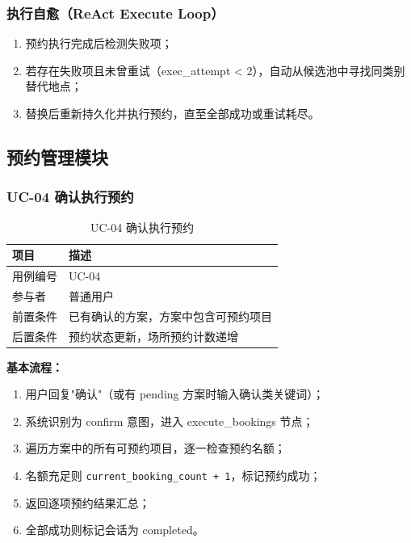 \documentclass[12pt,a4paper]{ctexart}
\begin{document}
\subsubsection{执行自愈（ReAct Execute Loop）}

\begin{enumerate}[label=(\arabic*)]
  \item 预约执行完成后检测失败项；
  \item 若存在失败项且未曾重试（exec\_attempt < 2），自动从候选池中寻找同类别替代地点；
  \item 替换后重新持久化并执行预约，直至全部成功或重试耗尽。
\end{enumerate}

\subsection{预约管理模块}

\subsubsection{UC-04 确认执行预约}

\begin{table}[ht]
\centering
\begin{tabular}{p{3cm}p{10cm}}
\toprule
\textbf{项目} & \textbf{描述} \\
\midrule
用例编号   & UC-04 \\
参与者     & 普通用户 \\
前置条件   & 已有确认的方案，方案中包含可预约项目 \\
后置条件   & 预约状态更新，场所预约计数递增 \\
\bottomrule
\end{tabular}
\caption{UC-04 确认执行预约}
\label{tab:uc04}
\end{table}

\textbf{基本流程：}

\begin{enumerate}[label=\textbf{步骤 \arabic*:}]
  \item 用户回复"确认"（或有 pending 方案时输入确认类关键词）；
  \item 系统识别为 confirm 意图，进入 execute\_bookings 节点；
  \item 遍历方案中的所有可预约项目，逐一检查预约名额；
  \item 名额充足则 \texttt{current\_booking\_count + 1}，标记预约成功；
  \item 返回逐项预约结果汇总；
  \item 全部成功则标记会话为 completed。
\end{enumerate}
\end{document}
